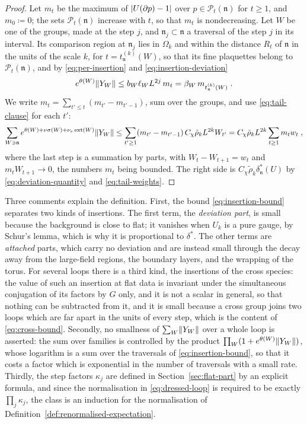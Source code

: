 \documentclass[11pt]{preprint}
\DeclarePairedDelimiter{\abs}{\lvert}{\rvert}
\DeclarePairedDelimiter{\norm}{\lVert}{\rVert}
\numberwithin{equation}{section}
\theoremstyle{definition}
\theoremstyle{remark}
\theoremstyle{plain}
\begin{document}
\begin{proof}
Let $m_t$ be the maximum of $\abs{U(\partial p) - 1}$ over $p \in \mathcal P_t(\mathfrak n)$ for $t \geq 1$, and $m_0 \coloneqq 0$; the sets $\mathcal P_t(\mathfrak n)$ increase with $t$, so that $m_t$ is nondecreasing. Let $W$ be one of the groups, made at the step $j$, and $\mathfrak n_j \subset \mathfrak n$ a traversal of the step $j$ in its interval. Its comparison region at $\mathfrak n_j$ lies in $\Omega_k$ and within the distance $R_t$ of $\mathfrak n$ in the units of the scale $k$, for $t = t^{(k)}_{\mathfrak n}(W)$, so that its fine plaquettes belong to $\mathcal P_t(\mathfrak n)$, and by \eqref{eq:per-insertion} and \eqref{eq:insertion-deviation}
\[
    e^{\theta(W)}\norm{Y_W} \leq b_W\ell_WL^{2j}\,m_t = \beta_W\,m_{t^{(k)}_{\mathfrak n}(W)}\;.
\]
We write $m_t = \sum_{t' \leq t}(m_{t'} - m_{t'-1})$, sum over the groups, and use \eqref{eq:tail-clause} for each $t'$:
\[
    \sum_{W \ni \mathfrak n}e^{\theta(W) + \nu\sigma(W) + \nu_e\operatorname{ext}(W)}\norm{Y_W} \leq \sum_{t' \geq 1}(m_{t'} - m_{t'-1})\,C_\chi\tilde\rho_kL^{2k}W_{t'} = C_\chi\tilde\rho_kL^{2k}\sum_{t \geq 1}m_tw_t\;,
\]
where the last step is a summation by parts, with $W_{t} - W_{t+1} = w_t$ and $m_tW_{t+1} \to 0$, the numbers $m_t$ being bounded. The right side is $C_\chi\tilde\rho_k\delta^{*}_{\mathfrak n}(U)$ by \eqref{eq:deviation-quantity} and \eqref{eq:tail-weights}.
\end{proof}

Three comments explain the definition. First, the bound \eqref{eq:insertion-bound} separates two kinds of insertions. The first term, the \emph{deviation part}, is small because the background is close to flat; it vanishes when $U_k$ is a pure gauge, by Schur's lemma, which is why it is proportional to $\delta^{*}$. The other terms are \emph{attached} parts, which carry no deviation and are instead small through the decay away from the large-field regions, the boundary layers, and the wrapping of the torus. For several loops there is a third kind, the insertions of the cross species: the value of such an insertion at flat data is invariant under the simultaneous conjugation of its factors by $G$ only, and it is not a scalar in general, so that nothing can be subtracted from it, and it is small because a cross group joins two loops which are far apart in the units of every step, which is the content of \eqref{eq:cross-bound}. Secondly, no smallness of $\sum_W\norm{Y_W}$ over a whole loop is asserted: the sum over families is controlled by the product $\prod_W(1 + e^{\theta(W)}\norm{Y_W})$, whose logarithm is a sum over the traversals of \eqref{eq:insertion-bound}, so that it costs a factor which is exponential in the number of traversals with a small rate. Thirdly, the step factors $\kappa_j$ are defined in Section~\ref{sec:flat-part} by an explicit formula, and since the normalisation in \eqref{eq:dressed-loop} is required to be exactly $\prod_j\kappa_j$, the class is an induction for the normalisation of Definition~\ref{def:renormalised-expectation}.
\end{document}
